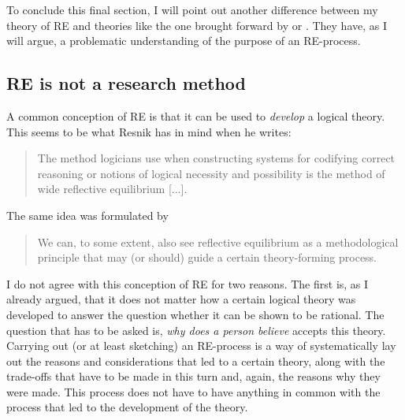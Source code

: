 \documentclass{article}
\begin{document}
To conclude this final section, I will point out another difference between my theory of RE and theories like the one brought forward by \citeauthor{resnik0} or \citeauthor{peregrinsvoboda}. They have, as I will argue, a problematic understanding of the purpose of an RE-process.

\subsection{RE is not a research method}
A common conception of RE is that it can be used to \textit{develop} a logical theory. This seems to be what Resnik has in mind when he writes:

\begin{quote}
    The method logicians use when constructing systems for codifying correct reasoning or notions of logical necessity and possibility is the method of wide reflective equilibrium [...]. \cite[p.~159]{resnik0}
\end{quote}

The same idea was formulated by 
\begin{quote}
    We can, to some extent, also see reflective equilibrium as a methodological principle that may (or should) guide a certain theory-forming process. \cite[p.~95]{peregrinsvoboda}
\end{quote}

I do not agree with this conception of RE for two reasons. The first is, as I already argued, that it does not matter how a certain logical theory was developed to answer the question whether it can be shown to be rational. The question that has to be asked is, \textit{why does a person believe} accepts this theory. Carrying out (or at least sketching) an RE-process is a way of systematically lay out the reasons and considerations that led to a certain theory, along with the trade-offs that have to be made in this turn and, again, the reasons why they were made. This process does not have to have anything in common with the process that led to the development of the theory.
\end{document}
